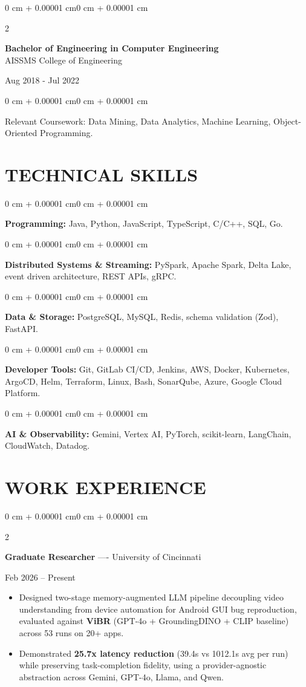 \documentclass[10pt, letterpaper]{article}
\newenvironment{highlights}{
    \begin{itemize}[
        topsep=0.10 cm,
        parsep=0.06 cm,
        partopsep=0pt,
        itemsep=0.06 cm,
        leftmargin=12pt
    ]
}{
    \end{itemize}
}
\newenvironment{onecolentry}{
    \begin{adjustwidth}{0 cm + 0.00001 cm}{0 cm + 0.00001 cm}
}{
    \end{adjustwidth}
}
\newenvironment{twocolentry}[2][]{
    \onecolentry
    \def\secondColumn{#2}
    \setcolumnwidth{\fill, 4.5 cm}
    \begin{paracol}{2}
}{
    \switchcolumn \raggedleft \secondColumn
    \end{paracol}
    \endonecolentry
}
\begin{document}
\begin{twocolentry}{
    Aug 2018 - Jul 2022
}
    \textbf{Bachelor of Engineering in Computer Engineering} \\
    AISSMS College of Engineering
\end{twocolentry}
\begin{onecolentry}
Relevant Coursework: Data Mining, Data Analytics, Machine Learning, Object-Oriented Programming.
\end{onecolentry}
\section{TECHNICAL SKILLS}
\begin{onecolentry}
\textbf{Programming:} Java, Python, JavaScript, TypeScript, C/C++, SQL, Go.
\end{onecolentry}
\vspace{0.06 cm}
\begin{onecolentry}
\textbf{Distributed Systems \& Streaming:} PySpark, Apache Spark, Delta Lake, event driven architecture, REST APIs, gRPC.
\end{onecolentry}
\vspace{0.06 cm}
\begin{onecolentry}
\textbf{Data \& Storage:} PostgreSQL, MySQL, Redis, schema validation (Zod), FastAPI.
\end{onecolentry}
\vspace{0.06 cm}
\begin{onecolentry}
\textbf{Developer Tools:} Git, GitLab CI/CD, Jenkins, AWS, Docker, Kubernetes, ArgoCD, Helm, Terraform, Linux, Bash, SonarQube, Azure, Google Cloud Platform.
\end{onecolentry}
\vspace{0.06 cm}
\begin{onecolentry}
\textbf{AI \& Observability:} Gemini, Vertex AI, PyTorch, scikit-learn, LangChain, CloudWatch, Datadog.
\end{onecolentry}

\section{WORK EXPERIENCE}
\begin{twocolentry}{Feb 2026 -- Present}
\textbf{Graduate Researcher} ---- University of Cincinnati
\end{twocolentry}
\begin{highlights}
  \item Designed two-stage memory-augmented LLM pipeline decoupling video understanding from device automation for Android GUI bug reproduction, evaluated against \textbf{ViBR} (GPT-4o + GroundingDINO + CLIP baseline) across 53 runs on 20+ apps.
  \item Demonstrated \textbf{25.7x latency reduction} (39.4s vs 1012.1s avg per run) while preserving task-completion fidelity, using a provider-agnostic abstraction across Gemini, GPT-4o, Llama, and Qwen.
\end{highlights}
\end{document}
